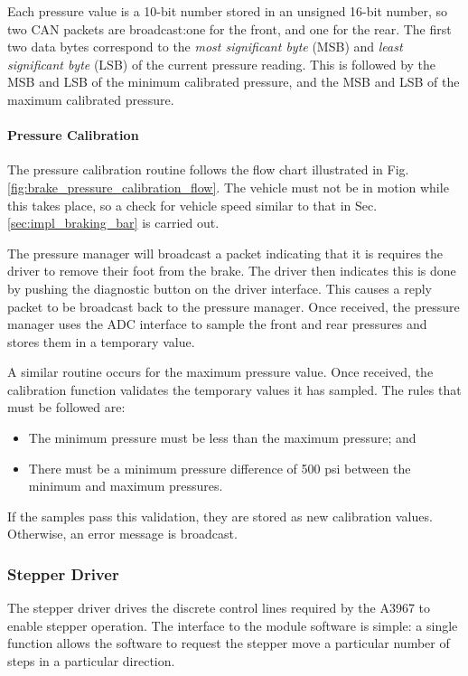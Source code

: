 Each pressure value is a 10-bit number stored in an unsigned 16-bit number, so two CAN packets are broadcast:one for the front, and one for the rear. The first two data bytes correspond to the \emph{most significant byte} (MSB) and \emph{least significant byte} (LSB) of the current pressure reading. This is followed by the MSB and LSB of the minimum calibrated pressure, and the MSB and LSB of the maximum calibrated pressure.

\paragraph{Pressure Calibration}

The pressure calibration routine follows the flow chart illustrated in Fig. \ref{fig:brake_pressure_calibration_flow}. The vehicle must not be in motion while this takes place, so a check for vehicle speed similar to that in Sec. \ref{sec:impl_braking_bar} is carried out. 

The pressure manager will broadcast a packet indicating that it is requires the driver to remove their foot from the brake. The driver then indicates this is done by pushing the diagnostic button on the driver interface. This causes a reply packet to be broadcast back to the pressure manager. Once received, the pressure manager uses the ADC interface to sample the front and rear pressures and stores them in a temporary value.

A similar routine occurs for the maximum pressure value. Once received, the calibration function validates the temporary values it has sampled. The rules that must be followed are:

\begin{itemize}
\item The minimum pressure must be less than the maximum pressure; and
\item There must be a minimum pressure difference of 500 psi between the minimum and maximum pressures.
\end{itemize}

If the samples pass this validation, they are stored as new calibration values. Otherwise, an error message is broadcast.

\subsubsection{Stepper Driver}

The stepper driver drives the discrete control lines required by the A3967 to enable stepper operation. The interface to the module software is simple: a single function allows the software to request the stepper move a particular number of steps in a particular direction.

